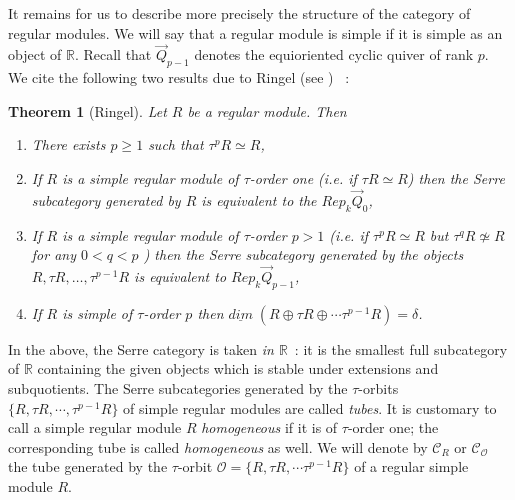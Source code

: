 \documentclass[a4paper,10pt]{amsart}
\newtheorem{theo}{\bf{Theorem}}[section]
\numberwithin{equation}{section}
\begin{document}
It remains for us to describe more precisely the structure of the category of regular modules. We will say that a regular module is simple if it is simple as an object of $\mathbb{R}$. Recall that $\vec{Q}_{p-1}$ denotes the equioriented cyclic quiver of rank $p$. We cite the following two results due to Ringel (see \cite{Ringelbook}) ~:

\vspace{.1in}

\begin{theo}[Ringel] Let $R$ be a regular module. Then
\begin{enumerate}
\item[i)] There exists $p \geq 1$ such that $\tau^p R \simeq R$,
\item[ii)] If $R$ is a simple regular module of $\tau$-order one (i.e. if $\tau R \simeq R$) then the Serre subcategory generated by $R$ is equivalent to the $Rep_k \vec{Q}_0$,
\item[iii)] If $R$ is a simple regular module of $\tau$-order $p>1$ (i.e. if $\tau^p R \simeq R$ but $\tau^{q} R \not\simeq R$ for any $0<q<p$ ) then the Serre subcategory generated by the objects $R, \tau R, \ldots, \tau^{p-1}R$ is equivalent to $Rep_k \vec{Q}_{p-1}$,
\item[iv)] If $R$ is simple of $\tau$-order $p$ then $\underline{dim}\;(R \oplus \tau R \oplus \cdots \tau^{p-1}R) =\delta$.
\end{enumerate}
\end{theo}

\vspace{.1in}

In the above, the Serre category is taken \textit{in $\mathbb{R}$}~: it is the smallest full subcategory of $\mathbb{R}$ containing the given objects which is stable under extensions and subquotients. The Serre subcategories generated by the $\tau$-orbits $\{R, \tau R, \cdots , \tau^{p-1}R\}$ of simple regular modules are called \textit{tubes}. It is customary to call a simple regular module $R$ \textit{homogeneous} if it is of $\tau$-order one; the corresponding tube is called \textit{homogeneous} as well. We will denote by $\mathcal{C}_R$ or $\mathcal{C}_{\mathcal{O}}$ the tube generated by the $\tau$-orbit $\mathcal{O}=\{R, \tau R, \cdots \tau^{p-1}R\}$ of a regular simple module $R$.

\vspace{.1in}
\end{document}
